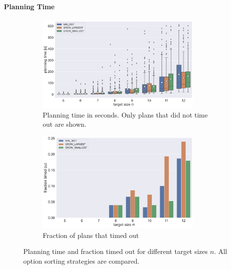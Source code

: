 \paragraph{Planning Time}

\begin{figure}
	\centering
	\begin{subfigure}[b]{\textwidth}
		\centering
		\includegraphics[width=0.9\textwidth]{figures/plots/AFN_time.pdf}
		\caption{Planning time in seconds. Only plans that did not time out are shown.}
		\label{fig:AFN_time}
	\end{subfigure}

	\begin{subfigure}[b]{\textwidth}
		\centering
		\includegraphics[width=0.9\textwidth]{figures/plots/AFN_timeout.pdf}
		\caption{Fraction of plans that timed out}
		\label{fig:AFN_timeout}
	\end{subfigure}
	\caption[Planning time and fraction timed out for different target sizes]{Planning time and fraction timed out for different target sizes $n$. All option sorting strategies are compared.}
	\label{fig:AFN_timestats}
\end{figure}

